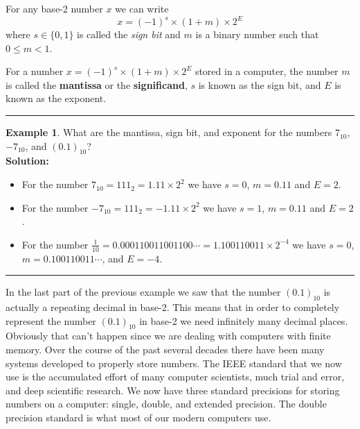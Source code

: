 \documentclass[
]{book}
\theoremstyle{definition}
\theoremstyle{definition}
\newtheorem{example}{Example}[chapter]
\theoremstyle{definition}
\theoremstyle{remark}
\begin{document}
For any base-2 number \(x\) we can write
\[x = (-1)^{s} \times (1+ m) \times 2^E\] where \(s \in \{0,1\}\) is
called the \emph{sign bit} and \(m\) is a binary number such that \(0 \le m < 1\).

For a number \(x = (-1)^{s} \times (1+m) \times 2^E\) stored in a
computer, the number \(m\) is called the \textbf{mantissa} or the
\textbf{significand}, \(s\) is known as the sign bit, and \(E\) is known as the
exponent.

\begin{center}\rule{0.5\linewidth}{0.5pt}\end{center}

\begin{example}
\protect\hypertarget{exm:unnamed-chunk-21}{}{\label{exm:unnamed-chunk-21} }What are the mantissa, sign bit, and exponent for the numbers \(7_{10}\),
\(-7_{10}\), and \((0.1)_{10}\)?\\
\textbf{Solution:}

\begin{itemize}
\item
  For the number \(7_{10}=111_2 = 1.11 \times 2^2\) we have \(s=0\),
  \(m=0.11\) and \(E=2\).
\item
  For the number \(-7_{10}=111_2 = -1.11 \times 2^2\) we have \(s=1\),
  \(m=0.11\) and \(E=2\).
\item
  For the number
  \(\frac{1}{10} = 0.000110011001100\cdots = 1.100110011 \times 2^{-4}\)
  we have \(s=0\), \(m=0.100110011\cdots\), and \(E = -4\).
\end{itemize}
\end{example}

\begin{center}\rule{0.5\linewidth}{0.5pt}\end{center}

In the last part of the previous example we saw that the number
\((0.1)_{10}\) is actually a repeating decimal in base-2. This means that
in order to completely represent the number \((0.1)_{10}\) in base-2 we
need infinitely many decimal places. Obviously that can't happen since
we are dealing with computers with finite memory. Over the course of the
past several decades there have been many systems developed to properly
store numbers. The IEEE standard that we now use is the accumulated
effort of many computer scientists, much trial and error, and deep
scientific research. We now have three standard precisions for storing
numbers on a computer: single, double, and extended precision. The
double precision standard is what most of our modern computers use.
\end{document}
